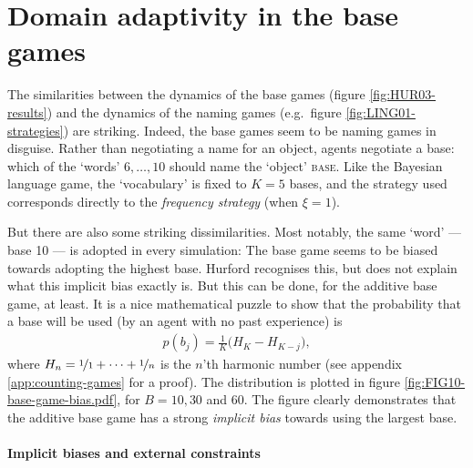 \documentclass{../src/bcthesispart}
\begin{document}
\section{Domain adaptivity in the base games}


The similarities between the dynamics of the base games (figure \ref{fig:HUR03-results}) and the dynamics of the naming games (e.g.~figure \ref{fig:LING01-strategies}) are striking.
Indeed, the base games seem to be naming games in disguise.
Rather than negotiating a name for an object, agents negotiate a base: which of the ‘words’ $6, \dots, 10$ should name the ‘object’ \textsc{base}.
Like the Bayesian language game, the ‘vocabulary’ is fixed to $K=5$ bases, and the strategy used corresponds directly to the \emph{frequency strategy} (when $\xi=1$). 





But there are also some striking dissimilarities.
Most notably, the same ‘word’ — base 10 — is adopted in every simulation:
The base game seems to be biased towards adopting the highest base. 
Hurford recognises this, but does not explain what this implicit bias exactly is.
But this can be done, for the additive base game, at least.
It is a nice mathematical puzzle to show that the probability that a base will be used (by an agent with no past experience) is
\begin{align}
	\label{eq:ch6:bias-additive-naming-game}
	p(b_j) 
		= \frac{1}{K} \bigl(H_K - H_{K-j}\bigr),
\end{align}
where $H_n = \nicefrac{1}{1} + \dots + \nicefrac{1}{n}$ is the $n$’th harmonic number (see appendix \ref{app:counting-games} for a proof).
The distribution is plotted in figure \ref{fig:FIG10-base-game-bias.pdf}, for $B=10, 30$ and $60$.
The figure clearly demonstrates that the additive base game has a strong \emph{implicit bias} towards using the largest base.



\paragraph{Implicit biases and external constraints}
\end{document}
